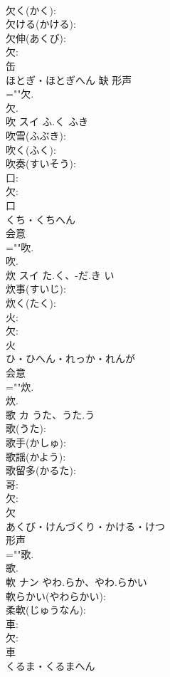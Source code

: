 \documentclass[8pt]{extreport}
\begin{document}
\begin{CJK}{UTF8}{min}
\\	欠く(かく): 
\\	欠ける(かける): 
\\	欠伸(あくび): 
\\	欠: 
\\	缶	
\\	ほとぎ・ほとぎへん	缺	形声 
\\	=""欠.
\\	欠.
\\	吹	スイ	ふ.く	ふき	
\\	吹雪(ふぶき): 
\\	吹く(ふく): 
\\	吹奏(すいそう): 
\\	口: 
\\	欠: 
\\	口	
\\	くち・くちへん	
\\	会意 
\\	=""吹.
\\	吹.
\\	炊	スイ	た.く、-だ.き	い	
\\	炊事(すいじ): 
\\	炊く(たく): 
\\	火: 
\\	欠: 
\\	火	
\\	ひ・ひへん・れっか・れんが	
\\	会意 
\\	=""炊.
\\	炊.
\\	歌	カ	うた、うた.う		
\\	歌(うた): 
\\	歌手(かしゅ): 
\\	歌謡(かよう): 
\\	歌留多(かるた): 
\\	哥: 
\\	欠: 
\\	欠	
\\	あくび・けんづくり・かける・けつ	
\\	形声 
\\	=""歌.
\\	歌.
\\	軟	ナン	やわ.らか、やわ.らかい		
\\	軟らかい(やわらかい): 
\\	柔軟(じゅうなん): 
\\	車: 
\\	欠: 
\\	車	
\\	くるま・くるまへん	

\end{CJK}
\end{document}
